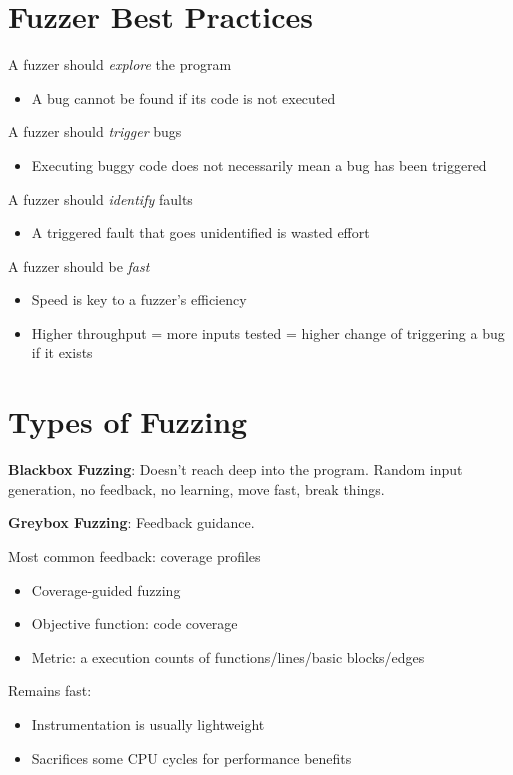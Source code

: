 \documentclass[11pt]{article}
\begin{document}
\section*{Fuzzer Best Practices}

A fuzzer should \textit{explore} the program
\begin{itemize}
	\item A bug cannot be found if its code is not executed
\end{itemize}

A fuzzer should \textit{trigger} bugs
\begin{itemize}
	\item Executing buggy code does not necessarily mean a bug has been triggered
\end{itemize}

A fuzzer should \textit{identify} faults
\begin{itemize}
	\item A triggered fault that goes unidentified is wasted effort
\end{itemize}

A fuzzer should be \textit{fast}
\begin{itemize}
	\item Speed is key to a fuzzer's efficiency
	\item Higher throughput = more inputs tested = higher change of triggering a bug if it exists
\end{itemize}

\section*{Types of Fuzzing}

\textbf{Blackbox Fuzzing}: Doesn't reach deep into the program. Random input generation, no feedback, no learning, move fast, break things. 

\textbf{Greybox Fuzzing}: Feedback guidance. 

Most common feedback: coverage profiles
\begin{itemize}
	\item Coverage-guided fuzzing
	\item Objective function: code coverage
	\item Metric: a execution counts of functions/lines/basic blocks/edges
\end{itemize}

Remains fast:
\begin{itemize}
	\item Instrumentation is usually lightweight
	\item Sacrifices some CPU cycles for performance benefits
\end{itemize}
\end{document}
